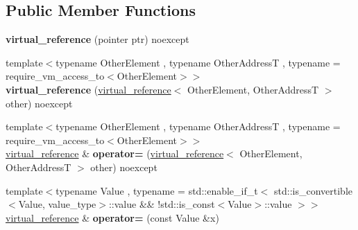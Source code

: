 \subsection*{Public Member Functions}
\begin{DoxyCompactItemize}
\item 
\mbox{\label{classdistant_1_1memory_1_1virtual__reference_a14cb9b6c4f14334a9c98d38bd5187b7b}} 
{\bfseries virtual\+\_\+reference} (pointer ptr) noexcept
\item 
\mbox{\label{classdistant_1_1memory_1_1virtual__reference_a5f3256bbfd67220c8e08b063deed43c8}} 
{\footnotesize template$<$typename Other\+Element , typename Other\+AddressT , typename  = require\+\_\+vm\+\_\+access\+\_\+to$<$\+Other\+Element$>$$>$ }\\{\bfseries virtual\+\_\+reference} (\mbox{\hyperlink{classdistant_1_1memory_1_1virtual__reference}{virtual\+\_\+reference}}$<$ Other\+Element, Other\+AddressT $>$ other) noexcept
\item 
\mbox{\label{classdistant_1_1memory_1_1virtual__reference_aa4cdb7a271a618acb61120702099b1d7}} 
{\footnotesize template$<$typename Other\+Element , typename Other\+AddressT , typename  = require\+\_\+vm\+\_\+access\+\_\+to$<$\+Other\+Element$>$$>$ }\\\mbox{\hyperlink{classdistant_1_1memory_1_1virtual__reference}{virtual\+\_\+reference}} \& {\bfseries operator=} (\mbox{\hyperlink{classdistant_1_1memory_1_1virtual__reference}{virtual\+\_\+reference}}$<$ Other\+Element, Other\+AddressT $>$ other) noexcept
\item 
\mbox{\label{classdistant_1_1memory_1_1virtual__reference_a0b6a48d5de31a3b83a07b660d4c2127c}} 
{\footnotesize template$<$typename Value , typename  = std\+::enable\+\_\+if\+\_\+t$<$					std\+::is\+\_\+convertible$<$\+Value, value\+\_\+type$>$\+::value \&\& 					!std\+::is\+\_\+const$<$\+Value$>$\+::value				$>$$>$ }\\\mbox{\hyperlink{classdistant_1_1memory_1_1virtual__reference}{virtual\+\_\+reference}} \& {\bfseries operator=} (const Value \&x)
\item 
\mbox{\label{classdistant_1_1memory_1_1virtual__reference_a4862e98044e44bea303a7cb0f69837a1}} 

\end{DoxyCompactItemize}
